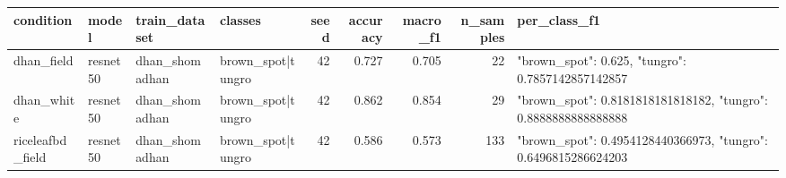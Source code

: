 \begin{tabular}{llllrrrrl}
\toprule
condition & model & train_dataset & classes & seed & accuracy & macro_f1 & n_samples & per_class_f1 \\
\midrule
dhan_field & resnet50 & dhan_shomadhan & brown_spot|tungro & 42 & 0.727 & 0.705 & 22 & {"brown_spot": 0.625, "tungro": 0.7857142857142857} \\
dhan_white & resnet50 & dhan_shomadhan & brown_spot|tungro & 42 & 0.862 & 0.854 & 29 & {"brown_spot": 0.8181818181818182, "tungro": 0.8888888888888888} \\
riceleafbd_field & resnet50 & dhan_shomadhan & brown_spot|tungro & 42 & 0.586 & 0.573 & 133 & {"brown_spot": 0.4954128440366973, "tungro": 0.6496815286624203} \\
\bottomrule
\end{tabular}
